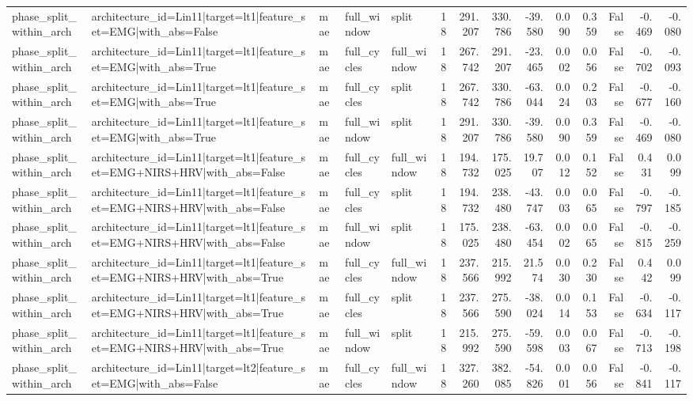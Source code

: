 \begin{table}
\begin{tabular}{lllllrrrrrrrrr}
phase_split_within_arch & architecture_id=Lin11|target=lt1|feature_set=EMG|with_abs=False & mae & full_window & split & 18 & 291.207 & 330.786 & -39.580 & 0.090 & 0.359 & False & -0.469 & -0.080 \\
phase_split_within_arch & architecture_id=Lin11|target=lt1|feature_set=EMG|with_abs=True & mae & full_cycles & full_window & 18 & 267.742 & 291.207 & -23.465 & 0.002 & 0.056 & False & -0.702 & -0.093 \\
phase_split_within_arch & architecture_id=Lin11|target=lt1|feature_set=EMG|with_abs=True & mae & full_cycles & split & 18 & 267.742 & 330.786 & -63.044 & 0.024 & 0.203 & False & -0.677 & -0.160 \\
phase_split_within_arch & architecture_id=Lin11|target=lt1|feature_set=EMG|with_abs=True & mae & full_window & split & 18 & 291.207 & 330.786 & -39.580 & 0.090 & 0.359 & False & -0.469 & -0.080 \\
phase_split_within_arch & architecture_id=Lin11|target=lt1|feature_set=EMG+NIRS+HRV|with_abs=False & mae & full_cycles & full_window & 18 & 194.732 & 175.025 & 19.707 & 0.012 & 0.152 & False & 0.431 & 0.099 \\
phase_split_within_arch & architecture_id=Lin11|target=lt1|feature_set=EMG+NIRS+HRV|with_abs=False & mae & full_cycles & split & 18 & 194.732 & 238.480 & -43.747 & 0.003 & 0.065 & False & -0.797 & -0.185 \\
phase_split_within_arch & architecture_id=Lin11|target=lt1|feature_set=EMG+NIRS+HRV|with_abs=False & mae & full_window & split & 18 & 175.025 & 238.480 & -63.454 & 0.002 & 0.065 & False & -0.815 & -0.259 \\
phase_split_within_arch & architecture_id=Lin11|target=lt1|feature_set=EMG+NIRS+HRV|with_abs=True & mae & full_cycles & full_window & 18 & 237.566 & 215.992 & 21.574 & 0.030 & 0.230 & False & 0.442 & 0.099 \\
phase_split_within_arch & architecture_id=Lin11|target=lt1|feature_set=EMG+NIRS+HRV|with_abs=True & mae & full_cycles & split & 18 & 237.566 & 275.590 & -38.024 & 0.014 & 0.153 & False & -0.634 & -0.117 \\
phase_split_within_arch & architecture_id=Lin11|target=lt1|feature_set=EMG+NIRS+HRV|with_abs=True & mae & full_window & split & 18 & 215.992 & 275.590 & -59.598 & 0.003 & 0.067 & False & -0.713 & -0.198 \\
phase_split_within_arch & architecture_id=Lin11|target=lt2|feature_set=EMG|with_abs=False & mae & full_cycles & full_window & 18 & 327.260 & 382.085 & -54.826 & 0.001 & 0.056 & False & -0.841 & -0.117 \\

\end{tabular}
\end{table}
